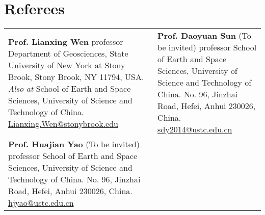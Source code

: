 \section*{Referees}
\renewcommand{\arraystretch}{2.0}

\begin{tabular}{p{} p{}}
\textbf{Prof. Lianxing Wen} \newline
professor \newline
Department of Geosciences, \newline
State University of New York at Stony Brook, \newline
Stony Brook, NY 11794, USA. \newline
\textit{Also at} School of Earth and Space Sciences, \newline
University of Science and Technology of China. \newline
\href{mailto:Lianxing.Wen@stonybrook.edu}{Lianxing.Wen@stonybrook.edu}
&
\textbf{Prof. Daoyuan Sun} (To be invited)\newline
professor \newline
School of Earth and Space Sciences, \newline
University of Science and Technology of China. \newline
No. 96, Jinzhai Road, Hefei, Anhui 230026, China. \newline
\href{mailto:sdy2014@ustc.edu.cn}{sdy2014@ustc.edu.cn}
\\

\textbf{Prof. Huajian Yao} (To be invited)\newline
professor \newline
School of Earth and Space Sciences, \newline
University of Science and Technology of China. \newline
No. 96, Jinzhai Road, Hefei, Anhui 230026, China. \newline
\href{mailto:hjyao@ustc.edu.cn}{hjyao@ustc.edu.cn}
&
~
\\
\end{tabular}
